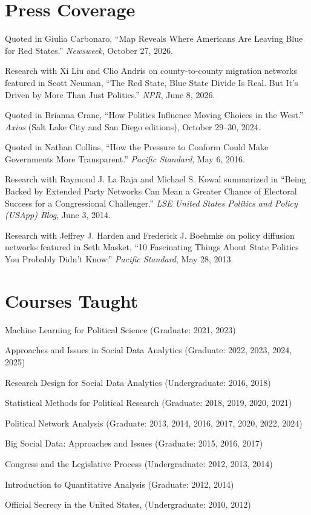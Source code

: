 \documentclass[overlapped,line]{res}
\begin{document}
\begin{resume}
\section{\bf Press Coverage}
\begin{etaremune}
\item Quoted in Giulia Carbonaro, ``Map Reveals Where Americans Are Leaving Blue for Red States.'' {\em Newsweek}, October 27, 2026.
\item Research with Xi Liu and Clio Andris on county-to-county migration networks featured in Scott Neuman, ``The Red State, Blue State Divide Is Real. But It's Driven by More Than Just Politics.'' {\em NPR}, June 8, 2026.
\item Quoted in Brianna Crane, ``How Politics Influence Moving Choices in the West.'' {\em Axios} (Salt Lake City and San Diego editions), October 29--30, 2024.
\item Quoted in Nathan Collins, ``How the Pressure to Conform Could Make Governments More Transparent.'' {\em Pacific Standard}, May 6, 2016.
\item Research with Raymond J. La Raja and Michael S. Kowal summarized in ``Being Backed by Extended Party Networks Can Mean a Greater Chance of Electoral Success for a Congressional Challenger.'' {\em LSE United States Politics and Policy (USApp) Blog}, June 3, 2014.
\item Research with Jeffrey J. Harden and Frederick J. Boehmke on policy diffusion networks featured in Seth Masket, ``10 Fascinating Things About State Politics You Probably Didn't Know.'' {\em Pacific Standard}, May 28, 2013.
\end{etaremune}

\section{\bf Courses Taught}
\begin{etaremune}
\item Machine Learning for Political Science (Graduate: 2021, 2023)
\item Approaches and Issues in Social Data Analytics (Graduate: 2022, 2023, 2024, 2025)
\item Research Design for Social Data Analytics (Undergraduate: 2016, 2018)
\item Statistical Methods for Political Research (Graduate: 2018, 2019, 2020, 2021)
\item Political Network Analysis (Graduate: 2013, 2014, 2016, 2017, 2020, 2022, 2024)
\item Big Social Data: Approaches and Issues (Graduate: 2015, 2016, 2017)
\item Congress and the Legislative Process (Undergraduate: 2012, 2013, 2014)
\item Introduction to Quantitative Analysis (Graduate: 2012, 2014)
\item Official Secrecy in the United States, (Undergraduate: 2010, 2012) 
\end{etaremune}


\end{resume}
\end{document}
